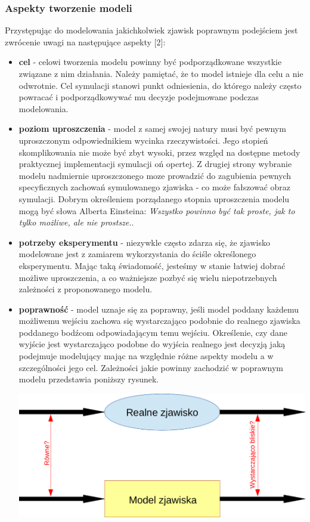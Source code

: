 \subsubsection{Aspekty tworzenie modeli}
\par{
Przystępując do modelowania jakichkolwiek zjawisk poprawnym podejściem jest zwrócenie uwagi na następujące aspekty [2]:
\begin{itemize}
\item \textbf{cel} - celowi tworzenia modelu powinny być podporządkowane wszystkie związane z nim działania. Należy pamiętać, że to model istnieje dla celu a nie odwrotnie. Cel symulacji stanowi punkt odniesienia, do którego należy często powracać i podporządkowywać mu decyzje podejmowane podczas modelowania.
\item \textbf{poziom uproszczenia} - model z samej swojej natury musi być pewnym uproszczonym odpowiednikiem wycinka rzeczywistości. Jego stopień skomplikowania nie może być zbyt wysoki, przez względ na dostępne metody praktycznej implementacji symulacji oń opertej. Z drugiej strony wybranie modelu nadmiernie uproszczonego moze prowadzić do zagubienia pewnych specyficznych zachowań symulowanego zjawiska - co może fałszować obraz symulacji. Dobrym określeniem porządanego stopnia uproszczenia modelu mogą być słowa Alberta Einsteina: \textit{Wszys­tko po­win­no być tak pros­te, jak to tyl­ko możli­we, ale nie pros­tsze.}.
\item \textbf{potrzeby eksperymentu} - niezywkle często zdarza się, że zjawisko modelowane jest z zamiarem wykorzystania do ściśle określonego eksperymentu. Mając taką świadomość, jesteśmy w stanie łatwiej dobrać możliwe uproszczenia, a co ważniejsze pozbyć się wielu niepotrzebnych zależności z proponowanego modelu.
\item \textbf{poprawność} - model uznaje się za poprawny, jeśli model poddany każdemu możliwemu wejściu zachowa się wystarczająco podobnie do realnego zjawiska poddanego bodźcom odpowiadającym temu wejściu. Określenie, czy dane wyjście jest wystarczająco podobne do wyjścia realnego jest decyzją jaką podejmuje modelujący mając na względnie różne aspekty modelu a w szczególności jego cel. Zależności jakie powinny zachodzić w poprawnym modelu przedstawia poniższy rysunek.
\par{
\begin{center}
\includegraphics[width=\textwidth,keepaspectratio]{img/poprawnosc_modelu}

\end{center}}
\end{itemize}}
